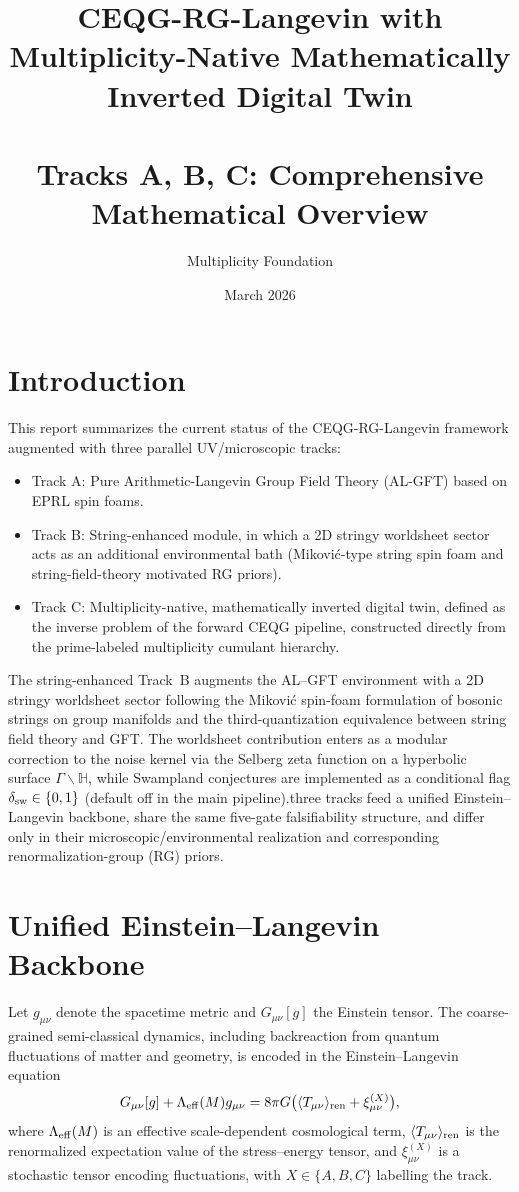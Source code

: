 \documentclass[11pt]{article}
\title{CEQG-RG-Langevin with Multiplicity-Native Mathematically Inverted Digital Twin\\\\Tracks A, B, C: Comprehensive Mathematical Overview}
\author{Multiplicity Foundation}
\date{March 2026}
\begin{document}
\maketitle

\section{Introduction}

This report summarizes the current status of the CEQG-RG-Langevin framework augmented with three parallel UV/microscopic tracks:

\begin{itemize}
  \item Track A: Pure Arithmetic-Langevin Group Field Theory (AL-GFT) based on EPRL spin foams.
  \item Track B: String-enhanced module, in which a 2D stringy worldsheet sector acts as an additional environmental bath (Mikovi\'c-type string spin foam and string-field-theory motivated RG priors).
  \item Track C: Multiplicity-native, mathematically inverted digital twin, defined as the inverse problem of the forward CEQG pipeline, constructed directly from the prime-labeled multiplicity cumulant hierarchy.
\end{itemize}

The string-enhanced Track~B augments the AL--GFT environment with a 2D stringy worldsheet sector following the Mikovi\'c spin-foam formulation of bosonic strings on group manifolds and the third-quantization equivalence between string field theory and GFT. The worldsheet contribution enters as a modular correction to the noise kernel via the Selberg zeta function on a hyperbolic surface $\Gamma\backslash\mathbb{H}$, while Swampland conjectures are implemented as a conditional flag $\delta_{\rm sw}\in\{0,1\}$ (default off in the main pipeline).\n\nAll three tracks feed a unified Einstein--Langevin backbone, share the same five-gate falsifiability structure, and differ only in their microscopic/environmental realization and corresponding renormalization-group (RG) priors.

\section{Unified Einstein--Langevin Backbone}

Let $g_{\mu\nu}$ denote the spacetime metric and $G_{\mu\nu}[g]$ the Einstein tensor. The coarse-grained semi-classical dynamics, including backreaction from quantum fluctuations of matter and geometry, is encoded in the Einstein--Langevin equation
\begin{equation}
  G_{\mu\nu}[g] + \Lambda_{\rm eff}(M) g_{\mu\nu}
  = 8\pi G \big( \langle T_{\mu\nu} \rangle_{\rm ren} + \xi^{(X)}_{\mu\nu} \big),
  \label{eq:einstein-langevin}
\end{equation}
where $\Lambda_{\rm eff}(M)$ is an effective scale-dependent cosmological term, $\langle T_{\mu\nu} \rangle_{\rm ren}$ is the renormalized expectation value of the stress--energy tensor, and $\xi^{(X)}_{\mu\nu}$ is a stochastic tensor encoding fluctuations, with $X \in \{A,B,C\}$ labelling the track.
\end{document}
